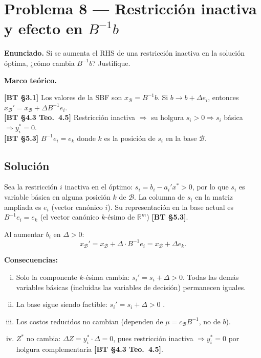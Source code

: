 \documentclass{article}
\newenvironment{marco}{\begin{mdframed}[linecolor=black!40,backgroundcolor=gray!5]\small\textbf{Marco teórico.}\par\smallskip}{\end{mdframed}\medskip}
\begin{document}
\section*{Problema 8 --- Restricción inactiva y efecto en $B^{-1}b$}

\textbf{Enunciado.} Si se aumenta el RHS de una restricción inactiva en la solución óptima, ¿cómo cambia $B^{-1}b$? Justifique.

\begin{marco}
\textbf{[BT §3.1]} Los valores de la SBF son $x_{\mathcal{B}} = B^{-1}b$. Si $b \to b + \Delta e_i$, entonces $x_{\mathcal{B}}' = x_{\mathcal{B}} + \Delta B^{-1}e_i$. \\[2pt]
\textbf{[BT §4.3 Teo.\ 4.5]} Restricción inactiva $\Rightarrow$ su holgura $s_i > 0 \Rightarrow s_i$ básica $\Rightarrow y_i^* = 0$. \\[2pt]
\textbf{[BT §5.3]} $B^{-1}e_i = e_k$ donde $k$ es la posición de $s_i$ en la base $\mathcal{B}$.
\end{marco}

\subsection*{Solución}

Sea la restricción $i$ inactiva en el óptimo: $s_i = b_i - a_i'x^* > 0$, por lo que $s_i$ es variable básica en alguna posición $k$ de $\mathcal{B}$. La columna de $s_i$ en la matriz ampliada es $e_i$ (vector canónico $i$). Su representación en la base actual es $B^{-1}e_i = e_k$ (el vector canónico $k$-ésimo de $\mathbb{R}^m$) \textbf{[BT §5.3]}.

Al aumentar $b_i$ en $\Delta > 0$:
\[
  x_{\mathcal{B}}' = x_{\mathcal{B}} + \Delta \cdot B^{-1}e_i = x_{\mathcal{B}} + \Delta e_k.
\]

\textbf{Consecuencias:}
\begin{enumerate}[(i)]
  \item Solo la componente $k$-ésima cambia: $s_i' = s_i + \Delta > 0$. Todas las demás variables básicas (incluidas las variables de decisión) permanecen iguales.
  \item La base sigue siendo factible: $s_i' = s_i + \Delta > 0$ \checkmark.
  \item Los costos reducidos no cambian (dependen de $\mu = c_{\mathcal{B}}B^{-1}$, no de $b$).
  \item $Z^*$ no cambia: $\Delta Z = y_i^* \cdot \Delta = 0$, pues restricción inactiva $\Rightarrow y_i^* = 0$ por holgura complementaria \textbf{[BT §4.3 Teo.\ 4.5]}.
\end{enumerate}
\end{document}
